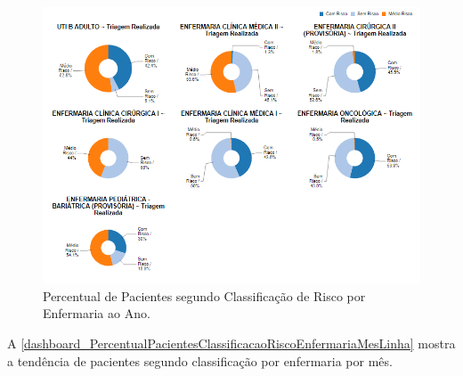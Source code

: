 \begin{figure}[htb]
	\caption{\label{dashboard_PercentualPacientesClassificacaoRiscoEnfermariaAnoPizza}Percentual de Pacientes segundo Classificação de Risco por Enfermaria ao Ano.}
	\begin{center}
	    \includegraphics[scale=0.6]{Imagens/2.3.PercentualPacientesClassificacaoRiscoEnfermariaAnoPizza.png}
	\end{center}
\end{figure}

\clearpage
A \autoref{dashboard_PercentualPacientesClassificacaoRiscoEnfermariaMesLinha} mostra a tendência de pacientes segundo classificação por enfermaria por mês.


